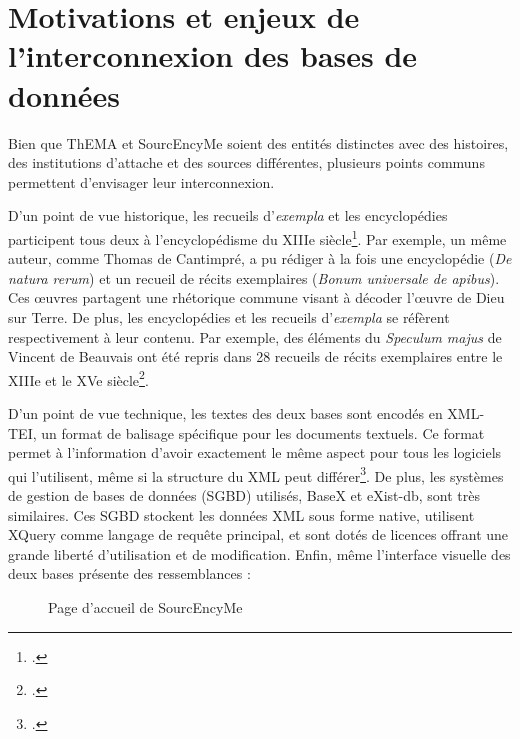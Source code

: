 \documentclass[a4paper,12pt,twoside]{book} %
\begin{document}
\section{Motivations et enjeux de l'interconnexion des bases de données}
Bien que ThEMA et SourcEncyMe soient des entités distinctes avec des histoires, des institutions d'attache et des sources différentes, plusieurs points communs permettent d'envisager leur interconnexion.

D'un point de vue historique, les recueils d'\textit{exempla} et les encyclopédies participent tous deux à l’encyclopédisme du XIIIe siècle\footcite{legoffPourquoiXIIIeSiecle1994}. Par exemple, un même auteur, comme Thomas de Cantimpré, a pu rédiger à la fois une encyclopédie (\textit{De natura rerum}) et un recueil de récits exemplaires (\textit{Bonum universale de apibus}). Ces œuvres partagent une rhétorique commune visant à décoder l'œuvre de Dieu sur Terre. De plus, les encyclopédies et les recueils d'\textit{exempla} se réfèrent respectivement à leur contenu. Par exemple, des éléments du \textit{Speculum majus} de Vincent de Beauvais ont été repris dans 28 recueils de récits exemplaires entre le XIIIe et le XVe siècle\footcite{berliozRecueilsExemplaDiffusion1994}.

D'un point de vue technique, les textes des deux bases sont encodés en XML-TEI, un format de balisage spécifique pour les documents textuels. Ce format permet à l'information d'avoir exactement le même aspect pour tous les logiciels qui l'utilisent, même si la structure du XML peut différer\footcite{burnardQuEstceQue2015}. De plus, les systèmes de gestion de bases de données (SGBD) utilisés, BaseX et eXist-db, sont très similaires. Ces SGBD stockent les données XML sous forme native, utilisent XQuery comme langage de requête principal, et sont dotés de licences offrant une grande liberté d'utilisation et de modification. Enfin, même l'interface visuelle des deux bases présente des ressemblances : \\

\begin{figure}[H]
	\centering
	\caption{Page d'accueil de SourcEncyMe}
\end{figure}
\end{document}
